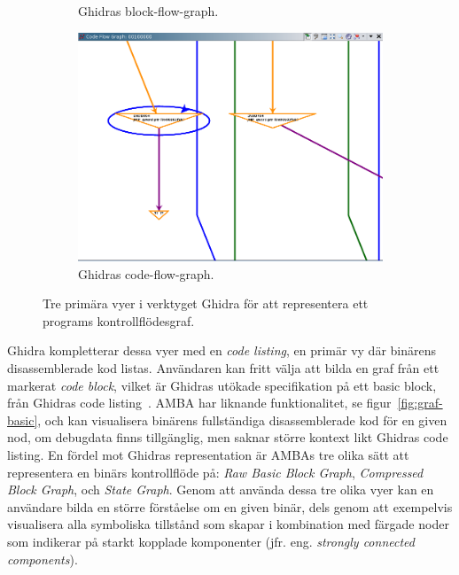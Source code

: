 \begin{figure}[H]
\begin{subfigure}{0.3\textwidth}
        \caption{Ghidras block-flow-graph.}
        \label{fig:ghidra_block_graph}
    \end{subfigure}
    \hspace*{\fill}
    \begin{subfigure}{0.3\textwidth}
        \includegraphics[width=\linewidth]{figures/ghidra_code_flow.png}
        \caption{Ghidras code-flow-graph.} \label{fig:ghidra_code_flow_graph}
    \end{subfigure}

    \caption{Tre primära vyer i verktyget Ghidra för att representera ett programs
        kontrollflödesgraf.} \label{fig:ghidra_figures}
\end{figure}

Ghidra kompletterar dessa vyer med en \textit{code listing}, en primär
vy där binärens disassemblerade kod listas. Användaren kan fritt välja
att bilda en graf från ett markerat \textit{code block}, vilket är
Ghidras utökade specifikation på ett basic block, från Ghidras code
listing~\cite{ghidra_website}. AMBA har liknande funktionalitet, se
figur~\ref{fig:graf-basic}, och kan visualisera binärens fullständiga
disassemblerade kod för en given nod, om debugdata finns tillgänglig, men saknar
större kontext likt Ghidras code listing. En fördel mot Ghidras representation
är AMBAs tre olika sätt att representera en binärs kontrollflöde på: \textit{Raw
Basic Block Graph}, \textit{Compressed Block Graph}, och \textit{State Graph}.
Genom att använda dessa tre olika vyer kan en användare bilda en större
förståelse om en given binär, dels genom att exempelvis visualisera alla
symboliska tillstånd som \stoe{} skapar i kombination med färgade noder som
indikerar på starkt kopplade komponenter (jfr. eng. \emph{strongly connected
components}).

